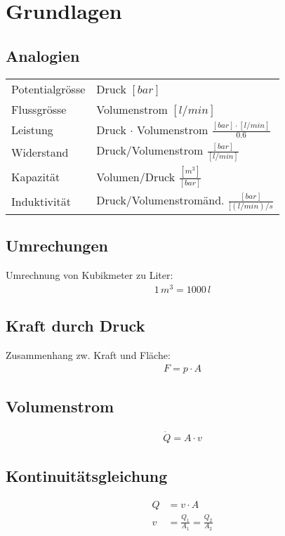 \section{Grundlagen}
\subsection{Analogien}
\begin{tabular}{ll}
Potentialgrösse & Druck $[bar]$ \\
Flussgrösse & Volumenstrom $[l/min]$ \\
Leistung & Druck $\cdot$ Volumenstrom $\frac{[bar] \cdot [l/min]}{0.6}$ \\
Widerstand & Druck/Volumenstrom $\frac{[bar]}{[l/min]}$ \\
Kapazität & Volumen/Druck $\frac{[m^3]}{[bar]}$ \\
Induktivität & Druck/Volumenstromänd. $\frac{[bar]}{[(l/min)/s}$
\end{tabular}
\subsection{Umrechungen}
Umrechnung von Kubikmeter zu Liter:
\begin{align*}
1\, m^3 = 1000 \, l
\end{align*}

\subsection{Kraft durch Druck}
Zusammenhang zw. Kraft und Fläche:
\begin{align*}
F = p \cdot A \tag{Kraft = Druck*Fläche}
\end{align*}

\subsection{Volumenstrom}
\begin{align*}
\dot{Q} = A \cdot v	
\end{align*}

\subsection{Kontinuitätsgleichung}
\begin{align*}
Q &= v \cdot A \tag{Massenerhalt} \\
v &= \frac{Q_1}{A_1} = \frac{Q_2}{A_2}
\end{align*}

